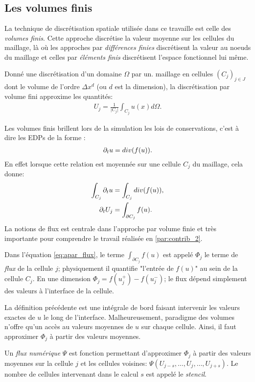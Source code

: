 \subsection{Les volumes finis}
    La technique de discrétisation spatiale utilisée dans ce travaille est celle des \textit{volumes finis}\cite{LeVeque1990}.
    Cette approche discrétise la valeur moyenne sur les cellules du maillage, là où les approches par \textit{différences finies} \cite{LeVeque2007} discrétisent la valeur au noeuds du maillage et 
    celles par \textit{éléments finis} \cite{Ciarlet1982} discrétisent l'espace fonctionnel lui même.
    \begin{definition}
        Donné une discrétisation d'un domaine $\Omega$ par un. maillage en cellules $(C_j)_{j\in J}$ dont le volume de l'ordre $\Delta x^d$ (ou $d$ est la dimension), 
        la discrétisation par volume fini approxime les quantités:
        \begin{align}
            U_j = \frac{1}{\vert C_j \vert} \int_{C_j} u(x) d\Omega.
        \end{align}
    \end{definition}
    Les volumes finis brillent lors de la simulation les lois de conservations, c'est à dire les EDPs de la forme :
    \begin{align}
        \partial_t u = div(f(u)).
    \end{align}
    En effet lorsque cette relation est moyennée sur une cellule $C_j$ du maillage, cela donne: 
    \begin{align}
        \int_{C_j} \partial_t u&= \int_{C_j}  div(f(u)),\\
        \partial_t U_j &= \int_{\partial C_j} f(u).\label{eq:apar_flux}
    \end{align}
    La notions de flux est centrale dans l'approche par volume finie et très importante pour comprendre le travail réalisée en \ref{par:contrib_2}.
    \begin{definition}
        Dans l'équation \ref{eq:apar_flux}, le terme $\int_{\partial C_j} f(u)$ est appelé $\Phi_j$ le terme de \textit{flux} de la cellule $j$;
        physiquement il quantifie "l'entrée de $f(u)$" au sein de la cellule $C_j$. En une dimension $\Phi_j = f(u^+_j) - f(u^-_j)$;
        le flux dépend simplement des valeurs à l'interface de la cellule.
    \end{definition}
    La définition précédente est une intégrale de bord faisant intervenir les valeurs exactes de $u$ le long de l'interface.
    Malheureusement, paradigme des volumes n'offre qu'un accès au valeurs moyennes de $u$ sur chaque cellule.
    Ainsi, il faut approximer $\Phi_j$ à partir des valeurs moyennes.
    \begin{definition}
        Un \textit{flux numérique} $\Psi$ est fonction permettant d’approximer $\Phi_j$ à partir des valeurs moyennes sur la cellule $j$ et les cellules voisines:
        $\Psi(U_{j-s} , \ldots , U_j ,\ldots , U_{j+s})$. Le nombre de cellules intervenant dans le calcul $s$ est appelé le \textit{stencil}.
    \end{definition}

